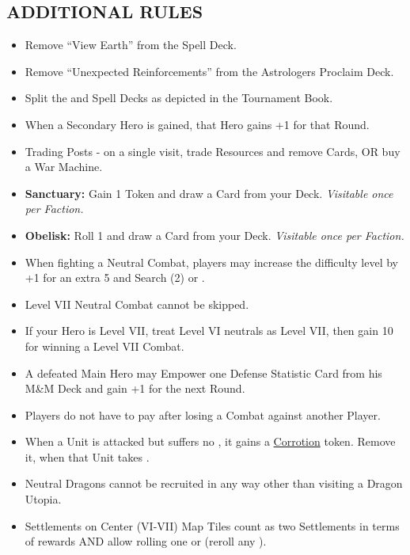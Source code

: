 \begin{multicols*}{2}
\subsection*{\MakeUppercase{Additional Rules}}
\begin{itemize}
  \item Remove ``View Earth'' from the Spell Deck.
  \item Remove ``Unexpected Reinforcements'' from the Astrologers Proclaim Deck.
  \item Split the  and Spell Decks as depicted in the Tournament Book.
  \item When a Secondary Hero is gained, that Hero gains +1  for that Round.
  \item Trading Posts - on a single visit, trade Resources and remove Cards, OR buy a War Machine.
  \item \textbf{Sanctuary:} Gain 1  Token and draw a Card from your Deck. \textit{Visitable once per Faction.}
  \item \textbf{Obelisk:} Roll 1  and draw a Card from your Deck. \textit{Visitable once per Faction.}
  \item When fighting a Neutral Combat, players may increase the difficulty level by +1 for an extra 5  and Search (2)  or . %
  \item Level VII Neutral Combat cannot be skipped.
  \item If your Hero is Level VII, treat Level VI neutrals as Level VII, then gain 10  for winning a Level VII Combat.
  \item A defeated Main Hero may Empower one Defense Statistic Card from his M\&M Deck and gain +1  for the next Round.
  \item Players do not have to pay  after losing a Combat against another Player.
  \item When a Unit is attacked but suffers no , it gains a \href{https://archon-studio.com/files/manuals/homm/HoMM-Stronghold-Mission-Book-Beta_EN.pdf}{Corrotion} token. Remove it, when that Unit takes .
  \item Neutral Dragons cannot be recruited in any way other than visiting a Dragon Utopia.
  \item Settlements on Center (VI-VII) Map Tiles count as two Settlements in terms of rewards AND allow rolling one  or  (reroll any ).

\end{itemize}
\end{multicols*}
